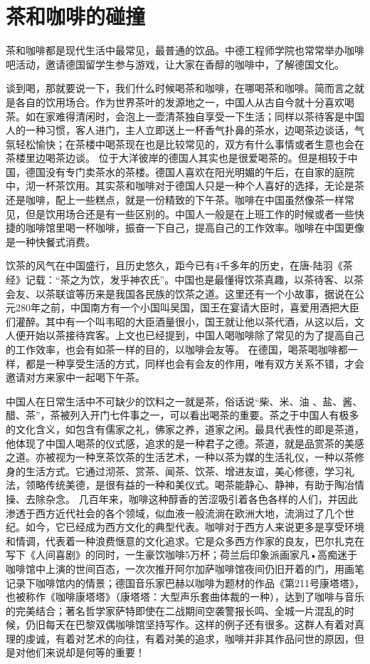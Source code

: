 \section{茶和咖啡的碰撞}
茶和咖啡都是现代生活中最常见，最普通的饮品。中德工程师学院也常常举办咖啡吧活动，邀请德国留学生参与游戏，让大家在香醇的咖啡中，了解德国文化。 

谈到喝，那就要说一下，我们什么时候喝茶和咖啡，在哪喝茶和咖啡。简而言之就是各自的饮用场合。作为世界茶叶的发源地之一，中国人从古自今就十分喜欢喝茶。如在家难得清闲时，会泡上一壶清茶独自享受一下生活；同样以茶待客是中国人的一种习惯，客人进门，主人立即送上一杯香气扑鼻的茶水，边喝茶边谈话，气氛轻松愉快；在茶楼中喝茶现在也是比较常见的，双方有什么事情或者生意也会在茶楼里边喝茶边谈。
位于大洋彼岸的德国人其实也是很爱喝茶的。但是相较于中国，德国没有专门卖茶水的茶楼。德国人喜欢在阳光明媚的午后，在自家的庭院中，沏一杯茶饮用。其实茶和咖啡对于德国人只是一种个人喜好的选择，无论是茶还是咖啡，配上一些糕点，就是一份精致的下午茶。咖啡在中国虽然像茶一样常见，但是饮用场合还是有一些区别的。中国人一般是在上班工作的时候或者一些快捷的咖啡馆里喝一杯咖啡，振奋一下自己，提高自己的工作效率。咖啡在中国更像是一种快餐式消费。

饮茶的风气在中国盛行，且历史悠久，距今已有4千多年的历史，在唐-陆羽《茶经》记载：“茶之为饮，发乎神农氏”。中国也是最懂得饮茶真趣，以茶待客、以茶会友、以茶联谊等历来是我国各民族的饮茶之道。这里还有一个小故事，据说在公元280年之前，中国南方有一个小国叫吴国，国王在宴请大臣时，喜爱用酒把大臣们灌醉。其中有一个叫韦昭的大臣酒量很小，国王就让他以茶代酒，从这以后，文人便开始以茶接待宾客。上文也已经提到，中国人喝咖啡除了常见的为了提高自己的工作效率，也会有如茶一样的目的，以咖啡会友等。
在德国，喝茶喝咖啡都一样，都是一种享受生活的方式，同样也会有会友的作用，唯有双方关系不错，才会邀请对方来家中一起喝下午茶。

中国人在日常生活中不可缺少的饮料之一就是茶，俗话说“柴、米、油 、盐、酱、醋、茶”，茶被列入开门七件事之一，可以看出喝茶的重要。茶之于中国人有极多的文化含义，如包含有儒家之礼，佛家之养，道家之闲。最具代表性的即是茶道，他体现了中国人喝茶的仪式感，追求的是一种君子之德。茶道，就是品赏茶的美感之道。亦被视为一种烹茶饮茶的生活艺术，一种以茶为媒的生活礼仪，一种以茶修身的生活方式。它通过沏茶、赏茶、闻茶、饮茶、增进友谊，美心修德，学习礼法，领略传统美德，是很有益的一种和美仪式。喝茶能静心、静神，有助于陶冶情操、去除杂念。
几百年来，咖啡这种醇香的苦涩吸引着各色各样的人们，并因此渗透于西方近代社会的各个领域，似血液一般流淌在欧洲大地，流淌过了几个世纪。如今，它已经成为西方文化的典型代表。咖啡对于西方人来说更多是享受环境和情调，代表着一种浪费惬意的文化追求。它是众多西方作家的良友，巴尔扎克在写下《人间喜剧》的同时，一生豪饮咖啡5万杯；荷兰后印象派画家凡•高痴迷于咖啡馆中上演的世间百态，一次次推开阿尔加萨咖啡馆夜间仍旧开着的门，用画笔记录下咖啡馆内的情景；德国音乐家巴赫以咖啡为题材的作品《第211号康塔塔》，也被称作《咖啡康塔塔》（康塔塔：大型声乐套曲体裁的一种），达到了咖啡与音乐的完美结合；著名哲学家萨特即使在二战期间空袭警报长鸣、全城一片混乱的时候，仍旧每天在巴黎双偶咖啡馆坚持写作。这样的例子还有很多。这群人有着对真理的虔诚，有着对艺术的向往，有着对美的追求，咖啡并非其作品问世的原因，但是对他们来说却是何等的重要！
